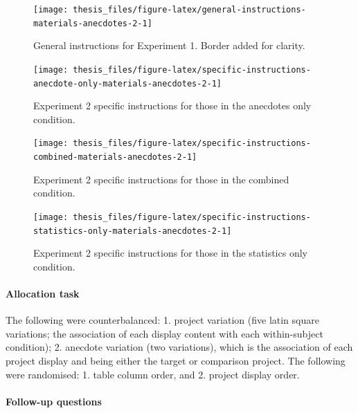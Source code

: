 \documentclass[a4paper, nobind, dvipsnames]{templates/ociamthesis}
\theoremstyle{definition}
\theoremstyle{definition}
\theoremstyle{definition}
\theoremstyle{definition}
\theoremstyle{remark}
\begin{document}
\begin{figure}
\texttt{[image: thesis\_files/figure-latex/general-instructions-materials-anecdotes-2-1]} \caption{General instructions for Experiment 1. Border added for clarity.}\label{fig:general-instructions-materials-anecdotes-2}
\end{figure}



\begin{figure}
\texttt{[image: thesis\_files/figure-latex/specific-instructions-anecdote-only-materials-anecdotes-2-1]} \caption{Experiment 2 specific instructions for those in the anecdotes only condition.}\label{fig:specific-instructions-anecdote-only-materials-anecdotes-2}
\end{figure}



\begin{figure}
\texttt{[image: thesis\_files/figure-latex/specific-instructions-combined-materials-anecdotes-2-1]} \caption{Experiment 2 specific instructions for those in the combined condition.}\label{fig:specific-instructions-combined-materials-anecdotes-2}
\end{figure}



\begin{figure}
\texttt{[image: thesis\_files/figure-latex/specific-instructions-statistics-only-materials-anecdotes-2-1]} \caption{Experiment 2 specific instructions for those in the statistics only condition.}\label{fig:specific-instructions-statistics-only-materials-anecdotes-2}
\end{figure}

\hypertarget{allocation-anecdotes-2-appendix}{%
\paragraph{Allocation task}\label{allocation-anecdotes-2-appendix}}

The following were counterbalanced: 1. project variation (five latin square
variations; the association of each display content with each within-subject
condition); 2. anecdote variation (two variations), which is the association of
each project display and being either the target or comparison project. The
following were randomised: 1. table column order, and 2. project display order.

\hypertarget{follow-up-materials-anecdotes-2}{%
\paragraph{Follow-up questions}\label{follow-up-materials-anecdotes-2}}
\end{document}
